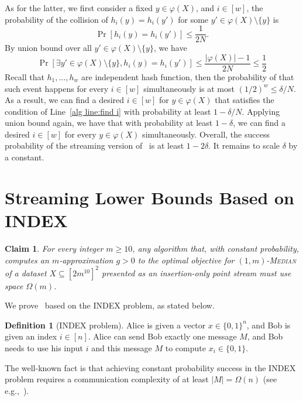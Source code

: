\documentclass[letterpaper,11pt]{article}
\theoremstyle{plain}
\newtheorem{claim}[theorem]{Claim}
\theoremstyle{definition}
\newtheorem{definition}[theorem]{Definition}
\theoremstyle{remark}
\renewcommand{\phi}{\varphi}
\newcommand{\ProblemName}[1]{\textsc{#1}}
\begin{document}
\begin{appendices}
As for the latter, we first consider a fixed $y\in \phi(X)$, and $i\in [w]$, the probability of the collision of $h_i(y)=h_i(y')$ for some $y'\in \phi(X)\setminus \{y\}$ is 
\begin{equation*}
    \Pr[h_i(y)=h_i(y')]\le \frac{1}{2N}.
\end{equation*}
By union bound over all $y'\in \phi(X)\setminus\{y\}$, we have 
\begin{equation*}
    \Pr[\exists y'\in \phi(X)\setminus\{y\}, h_i(y)=h_i(y')]\le \frac{|\phi(X)|-1}{2N}\le \frac{1}{2}
\end{equation*}
Recall that $h_1,\dots,h_w$ are independent hash function, then the probability of that such event happens for every $i\in[w]$ simultaneously is at most $(1/2)^w\le \delta/N$. As a result, we can find a desired $i\in[w]$ for $y\in \phi(X)$ that satisfies the condition of Line~\ref{alg line:find i} with probability at least $1-\delta/N$. Applying union bound again, we have that with probability at least $1-\delta$, we can find a desired $i\in[w]$ for every $y\in\phi(X)$ simultaneously. Overall, the success probability of the streaming version of~ is at least $1-2\delta$. It remains to scale $\delta$ by a constant. \section{Streaming Lower Bounds Based on INDEX}
\begin{claim}
    \label{claim:lb_m}
    For every integer $m\ge 10$, any algorithm that, with constant probability, computes an $m$-approximation $g>0$ to the optimal objective for \ProblemName{$(1,m)$-Median} of a dataset $X\subseteq [2m^{10}]^2$ presented as an insertion-only point stream must use space $\Omega(m)$.
\end{claim}

We prove~ based on the INDEX problem, as stated below.

\begin{definition}[INDEX problem]
    Alice is given a vector $x\in \{0,1\}^n$, and Bob is given an index $i\in[n]$. Alice can send Bob exactly one message $M$, and Bob needs to use his input $i$ and this message $M$ to compute $x_i\in \{0,1\}$.
\end{definition}
The well-known fact is that achieving constant probability success in the INDEX problem requires a communication complexity of at least $|M|=\Omega(n)$ (see e.g.,~\cite{DBLP:books/daglib/0011756, DBLP:journals/cc/KremerNR99, DBLP:journals/toc/JayramKS08}).


\end{appendices}
\end{document}
